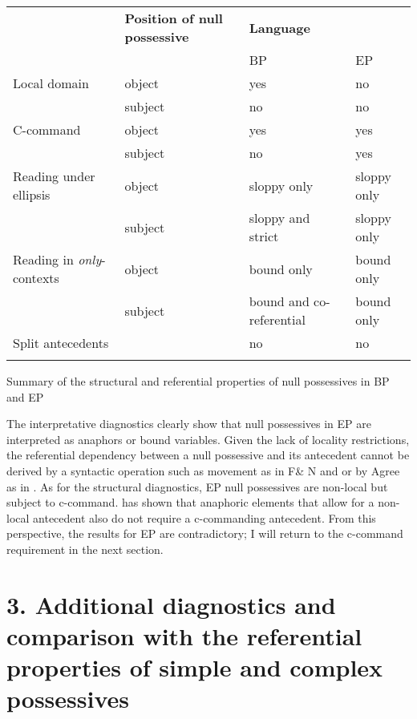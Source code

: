 \documentclass[output=paper]{langsci/langscibook}
\begin{document}
\begin{tabularx}{\textwidth}{XXXX}
\lsptoprule

\multicolumn{1}{X}{\textbf{Diagnostic}} & \textbf{Position of null possessive} & \multicolumn{2}{X}{\textbf{Language}}\\
\multicolumn{1}{X}{} &  & \multicolumn{1}{X}{BP} & EP\\
Local domain & object & yes & no\\
& subject & no & no\\
\hhline{~---}
C-command & object & yes & yes\\
& subject & no & yes\\
\hhline{~---}
Reading under ellipsis & object & sloppy only & sloppy only\\
& subject & sloppy and strict & sloppy only\\
\hhline{~---}
Reading in \textit{only}{}-contexts & object & bound only & bound only\\
& subject & bound and co-referential & bound only\\
\hhline{~---}
Split antecedents &  & no & no\\
\lspbottomrule
\end{tabularx}
\begin{table}
\caption{Summary of the structural and referential properties of null possessives in BP and EP}
\label{tab:key:1}
\end{table}

The interpretative diagnostics clearly show that null possessives in EP are interpreted as anaphors or bound variables. Given the lack of locality restrictions, the referential dependency between a null possessive and its antecedent cannot be derived by a syntactic operation such as movement as in F\& N and \citet{Rodrigues2010} or by Agree as in \citet{Hicks2009}. As for the structural diagnostics, EP null possessives are non-local but subject to c-command. \citet{Lebeaux1985} has shown that anaphoric elements that allow for a non-local antecedent also do not require a c-commanding antecedent. From this perspective, the results for EP are contradictory; I will return to the c-command requirement in the next section.

\section{ 3. Additional diagnostics and comparison with the referential properties of simple and complex possessives}
\end{document}
